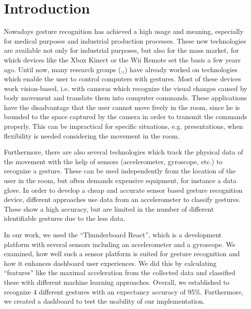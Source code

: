 
\chapter{Introduction}
\label{ch:Introduction}

Nowadays gesture recognition has achieved a high usage and meaning, especially for medical purposes and industrial production processes.
These new technologies are available not only for industrial purposes, but also for the mass market, for which devices like the Xbox Kinect or the Wii Remote set the basis a few years ago.
Until now, many research groups (\cite{vision1},\cite{vision3},\cite{vision2}) have already worked on technologies which enable the user to control computers with gestures.
Most of these devices work vision-based, i.e. with cameras which recognize the visual changes caused by body movement and translate them into computer commands.
These applications have the disadvantage that the user cannot move freely in the room, since he is bounded to the space captured by the camera in order to transmit the commands properly.
This can be impractical for specific situations, e.g. presentations, when flexibility is needed considering the movement in the room.

Furthermore, there are also several technologies which track the physical data of the movement with the help of sensors (accelerometer, gyroscope, etc.) to recognize a gesture.
These can be used independently from the location of the user in the room, but often demands expensive equipment, for instance a data glove.
In order to develop a cheap and accurate sensor based gesture recognition device, different approaches use data from an accelerometer to classify gestures.
These show a high accuracy, but are limited in the number of different identifiable gestures due to the less data.

In our work, we used the “Thunderboard React”, which is a development platform with several sensors including an accelerometer and a gyroscope.
We examined, how well such a sensor platform is suited for gesture recognition and how it enhances dashboard user experiences.
We did this by calculating “features” like the maximal acceleration from the collected data and classified these with different machine learning approaches.
Overall, we established to recognize 4 different gestures with an expectancy accuracy of 95\%.
Furthermore, we created a dashboard to test the usability of our implementation.
